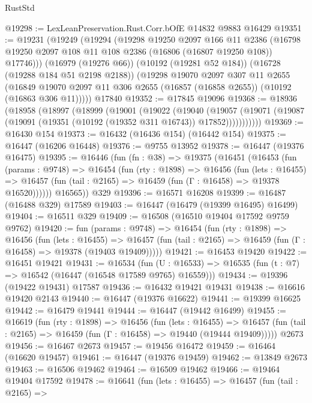 \begin{lexlean}{RustStd}
\begin{coremodule}
@19298 := LexLeanPreservation.Rust.Corr.bOfE @14832 @9883 @16429
@19351 := @19231
    (@19249
      (@19294
        (@19298
          @19250
          @2097
          @166
          @11
          @2386
          (@16798 @19250 @2097 @108 @11 @108 @2386 (@16806 (@16807 @19250 @108)) @17746)))
      (@16979 (@19276 @66))
      (@10192 (@19281 @52 @184))
      (@16728 (@19288 @184 @51 @2198 @2188))
      (@19298
        @19070
        @2097
        @307
        @11
        @2655
        (@16849 @19070 @2097 @11 @306 @2655 (@16857 (@16858 @2655)) (@10192 (@16863 @306 @11)))))
    @17840
@19352 := @17845 @19096
@19368 := @18936
    (@18958
      (@18997
        (@18999
          (@19001
            (@19022
              (@19040
                (@19057
                  (@19071 (@19087 (@19091 (@19351 (@10192 (@19352 @311 @16743)) @17852)))))))))))
@19369 := @16430 @154
@19373 := @16432 (@16436 @154) (@16442 @154)
@19375 := @16447 (@16206 @16448)
@19376 := @9755 @13952
@19378 := @16447 (@19376 @16475)
@19395 := @16446
    (fun (fn : @38) =>
    @19375
      (@16451
        (@16453
          (fun (params : @9748) =>
          @16454
            (fun (rty : @1898) =>
            @16456
              (fun (lets : @16455) =>
              @16457 (fun (tail : @2165) => @16459 (fun (Γ : @16458) => @19378 @16520))))))
        @16565))
    @329
@19396 := @16571 @16208
@19399 := @16487 (@16488 @329) @17589
@19403 := @16447 (@16479 (@19399 @16495) @16499)
@19404 := @16511 @329
@19409 := @16508 (@16510 @19404 @17592 @9759 @9762)
@19420 := fun (params : @9748) =>
  @16454
    (fun (rty : @1898) =>
    @16456
      (fun (lets : @16455) =>
      @16457 (fun (tail : @2165) => @16459 (fun (Γ : @16458) => @19378 (@19403 @19409)))))
@19421 := @16453 @19420
@19422 := @16451 @19421
@19431 := @16534
    (fun (U : @16533) => @16535 (fun (t : @7) => @16542 (@16447 (@16548 @17589 @9765) @16559)))
@19434 := @19396 (@19422 @19431) @17587
@19436 := @16432 @19421 @19431
@19438 := @16616 @19420 @2143
@19440 := @16447 (@19376 @16622)
@19441 := @19399 @16625
@19442 := @16479 @19441
@19444 := @16447 (@19442 @16499)
@19455 := @16619
    (fun (rty : @1898) =>
    @16456
      (fun (lets : @16455) =>
      @16457 (fun (tail : @2165) => @16459 (fun (Γ : @16458) => @19440 (@19444 @19409)))))
    @2673
@19456 := @16467 @2673
@19457 := @19456 @16472
@19459 := @16464 (@16620 @19457)
@19461 := @16447 (@19376 @19459)
@19462 := @13849 @2673
@19463 := @16506 @19462
@19464 := @16509 @19462
@19466 := @19464 @19404 @17592
@19478 := @16641
    (fun (lets : @16455) =>
    @16457
      (fun (tail : @2165) =>

\end{coremodule}
\end{lexlean}
